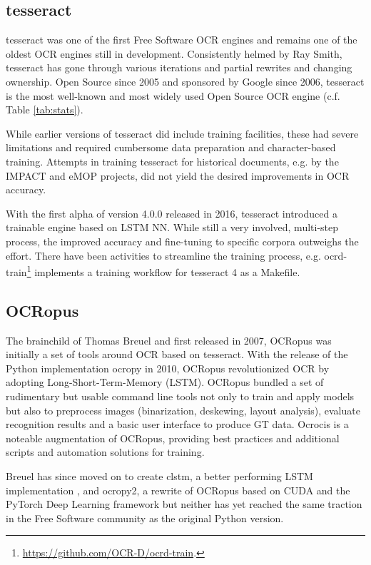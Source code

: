 \documentclass[conference]{IEEEtran}
\begin{document}
\subsection{tesseract}

tesseract \cite{4376991} was one of the first Free Software OCR
engines \cite{Rice1995TheFA} and remains one of the oldest OCR engines still in
development. Consistently helmed by Ray Smith, tesseract has gone
through various iterations and partial rewrites and changing
ownership. Open Source since 2005 and sponsored by Google since
2006, tesseract is the most well-known and most widely used Open
Source OCR engine (c.f. Table \ref{tab:stats}).

While earlier versions of tesseract did include training facilities, 
these had severe limitations and required cumbersome data preparation and
character-based training. Attempts in training tesseract for historical documents, e.g.
by the IMPACT \cite{PSNC} and eMOP \cite{doi:10.1093/llc/fqv062} projects, did not yield 
the desired improvements in OCR accuracy.

With the first alpha of version 4.0.0 released in 2016, tesseract introduced a trainable
engine based on LSTM NN.\cite{smith2016tesseract} While still a very involved, multi-step process, the
improved accuracy and fine-tuning to specific corpora outweighs the effort.
There have been activities to streamline the training process, e.g.
ocrd-train\footnote{\url{https://github.com/OCR-D/ocrd-train}.} implements a training workflow for
tesseract 4 as a Makefile.

\subsection{OCRopus}

The brainchild of Thomas Breuel and first released in 2007, OCRopus
\cite{breuel} was initially a set of tools around OCR based on
tesseract. With the release of the Python implementation ocropy in
2010, OCRopus revolutionized OCR by adopting
Long-Short-Term-Memory (LSTM). OCRopus bundled a set of rudimentary but
usable command line tools not only to train and apply models but
also to preprocess images (binarization, deskewing, layout analysis),
evaluate recognition results and a basic user interface to produce
GT data. Ocrocis is a noteable augmentation of OCRopus, providing best practices and
additional scripts and automation solutions for training.\cite{springmann2015ocrocis}

Breuel has since moved on to create clstm, a better
performing LSTM implementation \cite{DBLP:conf/icdar/Breuel17}, and
ocropy2, a rewrite of OCRopus based on CUDA and the PyTorch Deep
Learning framework \cite{DBLP:conf/icdar/Breuel17} but neither has
yet reached the same traction in the Free Software community as the
original Python version.
\end{document}
